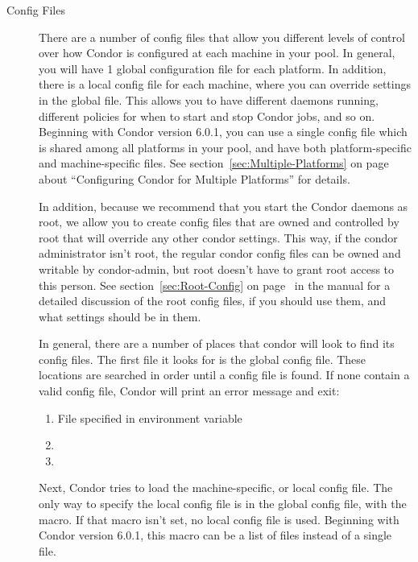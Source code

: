 \begin{description}
\item[Config Files] There are a number of config files that allow you
different levels of control over how Condor is configured at each
machine in your pool.  In general, you will have 1 global
configuration file for each platform.  In addition, there is a local
config file for each machine, where you can override settings in the
global file.  This allows you to have different daemons running,
different policies for when to start and stop Condor jobs, and so on.
Beginning with Condor version 6.0.1, you can use a single config file
which is shared among all platforms in your pool, and have both
platform-specific and machine-specific files.  See
section~\ref{sec:Multiple-Platforms} on
page~\pageref{sec:Multiple-Platforms} about ``Configuring Condor for
Multiple Platforms'' for details.

In addition, because we recommend that you start the Condor daemons as
root, we allow you to create config files that are owned and
controlled by root that will override any other condor settings.  This
way, if the condor administrator isn't root, the regular condor config
files can be owned and writable by condor-admin, but root doesn't have
to grant root access to this person.  See
section~\ref{sec:Root-Config} on page~\pageref{sec:Root-Config} in the
manual for a detailed discussion of the root config files, if you
should use them, and what settings should be in them.

In general, there are a number of places that condor will look to find
its config files.  The first file it looks for is the global config
file.  These locations are searched in order until a config file is
found.  If none contain a valid config file, Condor will print an
error message and exit:
\begin{enumerate}
   \item File specified in  environment variable
   \item {}
   \item {}
\end{enumerate}

Next, Condor tries to load the machine-specific, or local config file.
The only way to specify the local config file is in the global config
file, with the  macro.  If that macro isn't
set, no local config file is used.  Beginning with Condor version
6.0.1, this macro can be a list of files instead of a single file.


\end{description}
